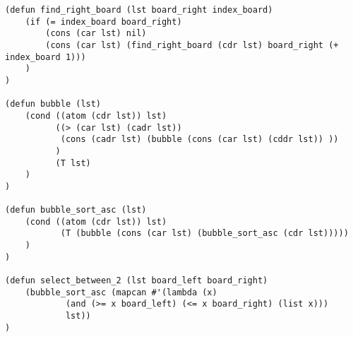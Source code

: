 \newpage
\begin{lstlisting}[basicstyle=\footnotesize, caption=Задание 9 (продолжение)]
(defun find_right_board (lst board_right index_board)
	(if (= index_board board_right)
	    (cons (car lst) nil) 
		(cons (car lst) (find_right_board (cdr lst) board_right (+ index_board 1)))
	)
)

(defun bubble (lst)
	(cond ((atom (cdr lst)) lst)
		  ((> (car lst) (cadr lst)) 
		   (cons (cadr lst) (bubble (cons (car lst) (cddr lst)) ))
		  )
		  (T lst)
	)
)

(defun bubble_sort_asc (lst)
	(cond ((atom (cdr lst)) lst)
		   (T (bubble (cons (car lst) (bubble_sort_asc (cdr lst)))))
	)
)

(defun select_between_2 (lst board_left board_right)
	(bubble_sort_asc (mapcan #'(lambda (x) 
			(and (>= x board_left) (<= x board_right) (list x)))
			lst))
)
\end{lstlisting}